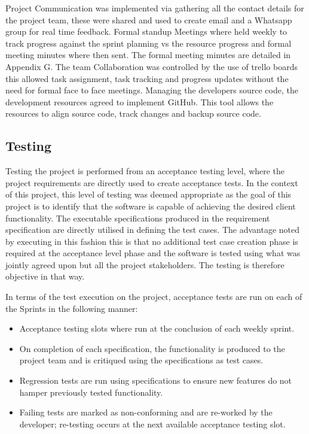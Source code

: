 \documentclass[12pt]{witseiepaper}
\begin{document}
Project Communication was implemented via gathering all the contact details for the project team, these were shared and used to create email and a Whatsapp group for real time feedback. Formal standup Meetings where held weekly to track progress against the sprint planning vs the resource progress and formal meeting minutes where then sent. The formal meeting minutes are detailed in Appendix G. The team Collaboration was controlled by the use of trello boards \cite{Trello} this allowed task assignment, task tracking and progress updates without the need for formal face to face meetings. Managing the developers source code, the development resources agreed to implement GitHub.\cite{GitHubRef} This tool allows the resources to align source code, track changes and backup source code. 

\subsection{Testing}
Testing the project is performed from an acceptance testing level, where the project requirements are directly used to create acceptance tests. \cite{AcceptanceTest} In the context of this project, this level of testing was deemed appropriate as the goal of this project is to identify that the software is capable of achieving the desired client functionality.
The executable specifications produced in the requirement specification are directly utilised in defining the test cases. The advantage noted by executing in this fashion this is that no additional test case creation phase is required at the acceptance level phase and the software is tested using what was jointly agreed upon but all the project stakeholders. The testing is therefore objective in that way.

In terms of the test execution on the project, acceptance tests are run on each of the Sprints in the following manner:



\begin{itemize}
	\item Acceptance testing slots where run at the conclusion of each weekly sprint.
	\item On completion of each specification, the functionality is produced to the project team and is critiqued using the specifications as test cases.
	\item Regression tests are run using specifications to ensure new features do not hamper previously tested functionality.
	\item Failing tests are marked as non-conforming and are re-worked by the developer; re-testing occurs at the next available acceptance testing slot. 
\end{itemize}
\end{document}
